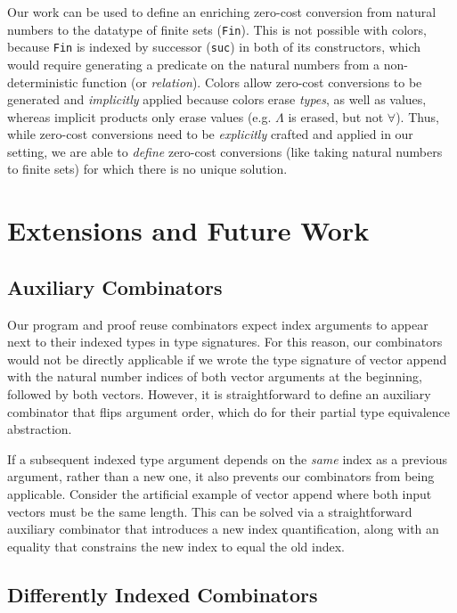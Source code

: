 \documentclass[acmsmall]{acmart}\settopmatter{}
\newcommand{\labsec}[1]{\label{sec:#1}}
\begin{document}
Our work can be used to define an enriching zero-cost conversion
from natural numbers to the datatype of
finite sets (\texttt{Fin}). This is not possible with colors, because
\texttt{Fin} is indexed by successor (\texttt{suc}) in both of its
constructors, which would require generating a predicate on the
natural numbers from a non-deterministic function (or
\textit{relation}). Colors allow zero-cost conversions to be
generated and \textit{implicitly} applied because colors erase \textit{types}, as
well as values, whereas implicit products only erase values
(e.g. $\Lambda$ is erased, but not $\forall$).
Thus, while zero-cost conversions
need to be \textit{explicitly} crafted and applied in our setting, we
are able to \textit{define} zero-cost conversions (like taking natural numbers to
finite sets) for which there is no unique solution.


\section{Extensions and Future Work}
\labsec{future}

\subsection{Auxiliary Combinators}

Our program and proof reuse combinators expect index arguments to
appear next to their indexed types in type signatures. For this
reason, our combinators would not be directly applicable if we wrote
the type signature of vector append with the natural number indices of
both vector arguments at the beginning, followed by both
vectors. However, it is straightforward to define an auxiliary combinator that
flips argument order, which \citet{dagand:interop} do for their
partial type equivalence abstraction.

If a subsequent indexed type argument depends on the \textit{same}
index as a previous argument, rather than a new one, it also prevents
our combinators from being applicable. Consider the
artificial example of vector append where both input vectors must be
the same length. This can be solved via a
straightforward auxiliary combinator that introduces a new index quantification,
along with an equality that constrains the new index to equal the old index.

\subsection{Differently Indexed Combinators}
\end{document}
